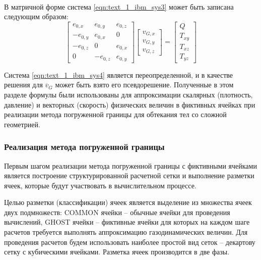 \

В матричной форме система \eqref{eqn:text_1_ibm_sys3} может быть записана следующим образом:
\begin{equation}\label{eqn:text_1_ibm_sys4}
	\begin{bmatrix}
		e_{0,x} & e_{0,y} & e_{0,z} \\
		-e_{0,y} & e_{0,x} & 0 \\
		-e_{0,z} & 0 & e_{0,x} \\
		0 & -e_{0,z} & e_{0,y}
	\end{bmatrix}
	\begin{bmatrix}
		v_{G,x} \\
		v_{G,y} \\
		v_{G,z}
	\end{bmatrix} =
	\begin{bmatrix}
		Q \\
		T_{xy} \\
		T_{xz} \\
		T_{yz}
	\end{bmatrix}			
\end{equation}

Система \eqref{eqn:text_1_ibm_sys4} является переопределенной, и в качестве решения для $\overline{v}_G$ может быть взято его псевдорешение.
Полученные в этом разделе формулы были использованы для аппроксимации скалярных (плотность, давление) и векторных (скорость) физических величин в фиктивных ячейках при реализации метода погруженной границы для обтекания тел со сложной геометрией.

\subsubsection{Реализация метода погруженной границы}\label{sec:text_1_immersed_boundary_method_realization}

Первым шагом реализации метода погруженной границы с фиктивными ячейками является построение структурированной расчетной сетки и выполнение разметки ячеек, которые будут участвовать в вычислительном процессе.


Целью разметки (классификации) ячеек является выделение из множества ячеек двух подмножеств: COMMON ячейки -- обычные ячейки для проведения вычислений, GHOST ячейки -- фиктивные ячейки для которых на каждом шаге расчетов требуется выполнять аппроксимацию газодинамических величин.
Для проведения расчетов будем использовать наиболее простой вид сеток -- декартову сетку с кубическими ячейками.
Разметка ячеек производится в две фазы.

